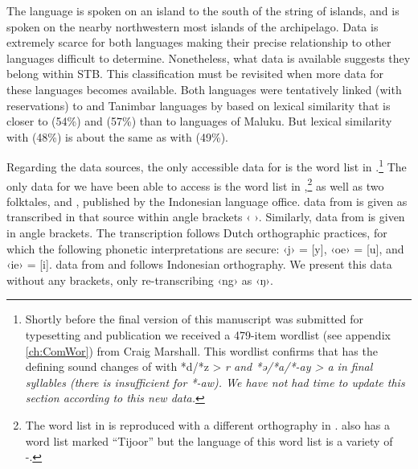 The  language is spoken on an island to the south of the
 string of islands,
and  is spoken on the nearby northwestern most islands of the  archipelago.
Data is extremely scarce for both languages making their precise
relationship to other languages difficult to determine.
Nonetheless, what data is available suggests they belong within STB.
This classification must be revisited when more data for these languages becomes available.
Both languages were tentatively linked (with reservations) to
 and Tanimbar languages by \citet{Hughes1987} based on lexical
similarity that is closer to  (54{\%})
and  (57{\%}) than to  languages of Maluku.
But lexical similarity with  (48{\%}) is about the same
as with  (49{\%}).

Regarding the data sources,
the only accessible data for  is the word list in \citet{Wallace1869}.\footnote{
		Shortly before the final version of this manuscript was
		submitted for typesetting and publication we received a 479-item
		 wordlist (see appendix \ref{ch:ComWor}) from Craig Marshall.
		This wordlist confirms that  has the defining sound changes
		of  with *d/*z > \it{r} and
		*ə/*a/*-ay > \it{a} in final syllables (there is insufficient for *-aw).
		We have not had time to update this section according to this new data.}
The only data for  we have been able to access is the word list
in \citet[108--114]{vonRosenberg1867},\footnote{
		The  word list
		in \citet{vonRosenberg1867} is reproduced with a
		different orthography in \citet[600--613]{vonRosenberg1878}.
		\citet{vonRosenberg1867,vonRosenberg1867} also has a word list
		marked “Tijoor” but the language of this word list is a variety
		of -.}
as well as two folktales,
\citet{Ohoiwutun2021} and \citet{Rado2021},
published by the Indonesian language office.
 data from \citet{Wallace1869} is given as transcribed in
that source within angle brackets ‹ ›.
Similarly,  data from \citet{vonRosenberg1867} is given in angle brackets.
The transcription follows Dutch orthographic practices,
for which the following phonetic interpretations are secure:
‹j› = [y], ‹oe› = [u], and ‹ie› = [i].
 data from \citet{Ohoiwutun2021}
and \citet{Rado2021} follows Indonesian orthography.
We present this data without any brackets,
only re-transcribing ‹ng› as ‹ŋ›.

